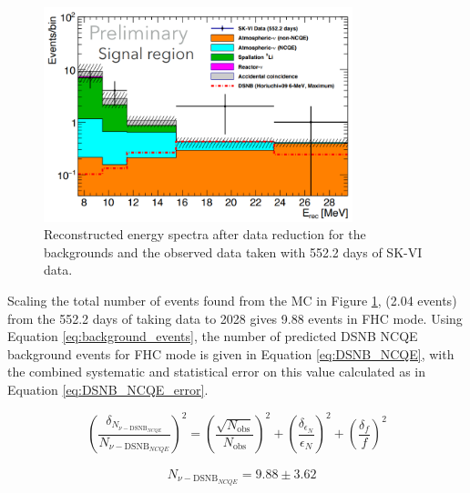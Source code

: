 \begin{figure}[!htb]
    \centering
    \includegraphics[width=0.8\textwidth]{Figures/DSNB_hist.png}
    \caption{Reconstructed energy spectra after data reduction for the backgrounds and the observed data taken with 552.2 days of SK-VI data.}
    \label{fig:DSNB_hist}
\end{figure}

Scaling the total number of events found from the MC in Figure \ref{fig:DSNB_hist}, (2.04 events) from the 552.2 days of taking data to 2028 gives 9.88 events in FHC mode. Using Equation \ref{eq:background_events}, the number of predicted DSNB NCQE background events for FHC mode is given in Equation \ref{eq:DSNB_NCQE}, with the combined systematic and statistical error on this value calculated as in Equation \ref{eq:DSNB_NCQE_error}.

\begin{equation}
    \left(\frac{\delta_{N_{\nu-\mathrm{DSNB}_{NCQE}}}}{N_{\nu-\mathrm{DSNB}_{NCQE}}}\right)^{2} = \left({\frac{\sqrt{N_{\text{obs}}}}{N_{\text{obs}}}}\right)^{2} + \left({\frac{\delta_{\epsilon_{N}}}{\epsilon_{N}}}\right)^{2} + \left({\frac{\delta_{f}}{f}}\right)^{2}
\label{eq:DSNB_NCQE_error}
\end{equation}


\begin{equation}
    \begin{aligned}
        & N_{\nu-\mathrm{DSNB}_{NCQE}}= 9.88 \pm 3.62 \\
    \label{eq:DSNB_NCQE}
    \end{aligned}
\end{equation}


